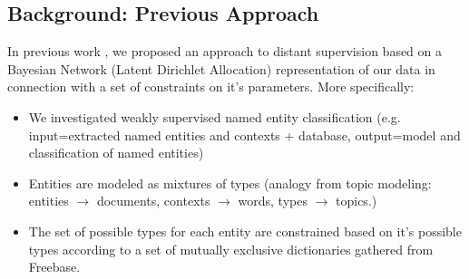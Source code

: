 \documentclass[12pt]{article}
\begin{document}
\subsection{Background: Previous Approach}
In previous work \citep{Ritter11}, we proposed an approach to distant supervision based on a Bayesian Network (Latent Dirichlet Allocation) representation of our data
in connection with a set of constraints on it's parameters.  More specifically:
\begin{itemize}
  \item We investigated weakly supervised named entity classification (e.g. input=extracted named entities and contexts + database, output=model and classification of named entities)
  \item Entities are modeled as mixtures of types (analogy from topic modeling: entities $\rightarrow$ documents, contexts $\rightarrow$ words, types $\rightarrow$ topics.)
  \item The set of possible types for each entity are constrained based on it's possible types according to a set of mutually exclusive dictionaries gathered from Freebase.
\end{itemize}
\end{document}

